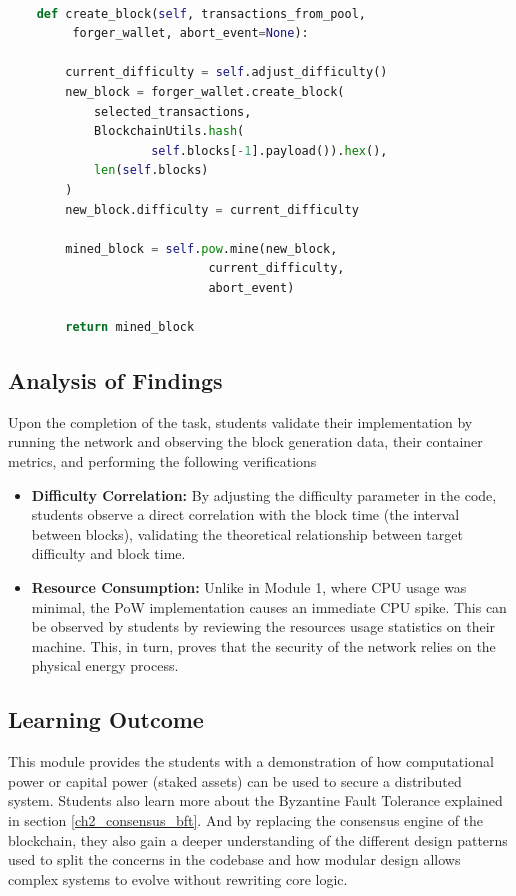 \begin{lstlisting}[language=Python, caption=Code snippet of the create\_block function, label=lst:mod2_blockchain_integration]

    def create_block(self, transactions_from_pool,
         forger_wallet, abort_event=None):

        current_difficulty = self.adjust_difficulty()
        new_block = forger_wallet.create_block(
            selected_transactions,
            BlockchainUtils.hash(
                    self.blocks[-1].payload()).hex(),
            len(self.blocks)
        )
        new_block.difficulty = current_difficulty

        mined_block = self.pow.mine(new_block, 
                            current_difficulty,
                            abort_event)
                    
        return mined_block
\end{lstlisting}

\subsection{Analysis of Findings}
Upon the completion of the task, students validate their implementation by running the network and observing the block generation data, their container metrics, and performing the following verifications

\begin{itemize}
    \item \textbf{Difficulty Correlation:} By adjusting the difficulty parameter in the code, students observe a direct correlation with the block time (the interval between blocks), validating the theoretical relationship between target difficulty and block time.
    \item \textbf{Resource Consumption:} Unlike in Module 1, where CPU usage was minimal, the PoW implementation causes an immediate CPU spike. This can be observed by students by reviewing the resources usage statistics on their machine. This, in turn, proves that the security of the network relies on the physical energy process.

\end{itemize}

\subsection{Learning Outcome}
This module provides the students with a demonstration of how computational power or capital power (staked assets) can be used to secure a distributed system. Students also learn more about the Byzantine Fault Tolerance explained in section \ref{ch2_consensus_bft}. And by replacing the consensus engine of the blockchain, they also gain a deeper understanding of the different design patterns used to split the concerns in the codebase and how modular design allows complex systems to evolve without rewriting core logic.

